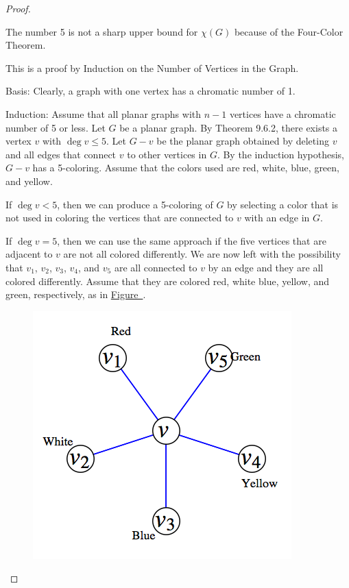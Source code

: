 \documentclass[10pt,]{book}
\theoremstyle{plain}
\theoremstyle{definition}
\theoremstyle{definition}
\theoremstyle{definition}
\theoremstyle{definition}
\theoremstyle{definition}
\numberwithin{equation}{section}
\begin{document}
\begin{proof}\hypertarget{proof-8}{}
The number 5 is not a sharp upper bound for \(\chi(G)\) because of the Four-Color Theorem.%
\par
This is a proof by Induction on the Number of Vertices in the Graph.%
\par
Basis: Clearly, a graph with one vertex has a chromatic number of 1.%
\par
Induction: Assume that all planar graphs with \(n - 1\) vertices have a chromatic number of 5 or less. Let \(G\) be a planar graph. By Theorem
9.6.2, there exists a vertex \(v\) with \(\deg  v \leq 5\). Let \(G - v\) be the planar graph obtained by deleting \(v\) and all edges
that connect \(v\) to other vertices in \(G\). By the induction hypothesis, \(G - v\) has a 5-coloring. Assume that the colors used
are red, white, blue, green, and yellow. %
\par
If \(\deg  v < 5\), then we can produce a 5-coloring of \(G\) by selecting a color that is not used in coloring the vertices that are connected
to \(v\) with an edge in \(G\).%
\par
If \(\deg  v = 5\), then we can use the same approach if the five vertices that are adjacent to \(v\) are not all colored differently. We are
now left with the possibility that \(v_1\), \(v_2\), \(v_3\), \(v_4\), and \(v_5\) are all connected to \(v\) by an edge and they are all colored
differently. Assume that they are colored red, white blue, yellow, and green, respectively, as in \hyperref[fig-five-coloring-proof]{Figure~}. %
\leavevmode%
\begin{figure}
\centering
\includegraphics[width=1\linewidth]{images/fig-five-coloring-proof.png}

\end{figure}
\end{proof}
\end{document}

